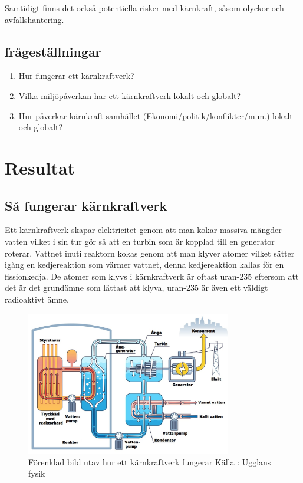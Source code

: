 \documentclass[11p]{article}
\begin{document}
    Samtidigt finns det också potentiella risker med kärnkraft, såsom olyckor och avfallshantering.


    \subsection{frågeställningar}
    \begin{enumerate}
        \item Hur fungerar ett kärnkraftverk?
        \item Vilka miljöpåverkan har ett kärnkraftverk lokalt och globalt?
        \item Hur påverkar kärnkraft samhället (Ekonomi/politik/konflikter/m.m.) lokalt och globalt?
    \end{enumerate}

    \section{Resultat}

    \subsection{Så fungerar kärnkraftverk}
    Ett kärnkraftverk skapar elektricitet genom att man kokar massiva mängder vatten vilket i sin tur gör så att en turbin som är kopplad till en generator roterar.
    Vattnet inuti reaktorn kokas genom att man klyver atomer vilket sätter igång en kedjereaktion som värmer vattnet, denna kedjereaktion kallas för en fissionkedja.
    De atomer som klyvs i kärnkraftverk är oftast uran-235 eftersom att det är det grundämne som lättast att klyva, uran-235 är även ett väldigt radioaktivt ämne.
    \parencite{Vattenfall}
    \begin{figure}[!h]
        \includegraphics[width=0.8\textwidth]{karnkraftverk-2}
        \caption{Förenklad bild utav hur ett kärnkraftverk fungerar Källa : Ugglans fysik}
        \label{bild}
    \end{figure}
    \printbibliography
\end{document}
